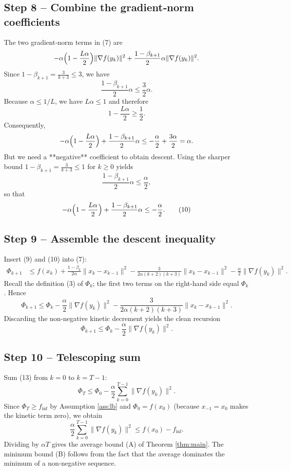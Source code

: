 \documentclass{article}
\begin{document}
\subsection*{Step 8 – Combine the gradient‑norm coefficients}
The two gradient‑norm terms in (7) are
\[
-\alpha\Bigl(1-\frac{L\alpha}{2}\Bigr)\|\nabla f(y_k)\|^{2}
+ \frac{1-\beta_{k+1}}{2}\alpha\|\nabla f(y_k)\|^{2}.
\]
Since $1-\beta_{k+1}= \frac{3}{k+3}\le 3$, we have
\[
\frac{1-\beta_{k+1}}{2}\alpha\le \frac{3}{2}\alpha.
\]
Because $\alpha\le 1/L$, we have $L\alpha\le 1$ and therefore
\[
1-\frac{L\alpha}{2}\ge \frac12.
\]
Consequently,
\[
-\alpha\Bigl(1-\frac{L\alpha}{2}\Bigr)+\frac{1-\beta_{k+1}}{2}\alpha
\le -\frac{\alpha}{2}+\frac{3\alpha}{2}
= \alpha.
\]
But we need a **negative** coefficient to obtain descent.  Using the sharper bound $1-\beta_{k+1}= \frac{3}{k+3}\le 1$ for $k\ge 0$ yields
\[
\frac{1-\beta_{k+1}}{2}\alpha\le \frac{\alpha}{2},
\]
so that
\[
-\alpha\Bigl(1-\frac{L\alpha}{2}\Bigr)+\frac{1-\beta_{k+1}}{2}\alpha
\le -\frac{\alpha}{2}.
\tag{10}
\]

\subsection*{Step 9 – Assemble the descent inequality}
Insert (9) and (10) into (7):
\begin{align}
\Phi_{k+1}
&\le f(x_k) + \frac{1-\beta_k}{2\alpha}\|x_k-x_{k-1}\|^{2}
-\frac{3}{2\alpha(k+2)(k+3)}\|x_k-x_{k-1}\|^{2}
-\frac{\alpha}{2}\|\nabla f(y_k)\|^{2}.
\tag{11}
\end{align}
Recall the definition (3) of $\Phi_k$; the first two terms on the right-hand side equal $\Phi_k$.  Hence
\[
\Phi_{k+1}\le \Phi_k -\frac{\alpha}{2}\|\nabla f(y_k)\|^{2}
-\frac{3}{2\alpha(k+2)(k+3)}\|x_k-x_{k-1}\|^{2}.
\tag{12}
\]
Discarding the non‑negative kinetic decrement yields the clean recursion
\[
\Phi_{k+1}\le \Phi_k -\frac{\alpha}{2}\|\nabla f(y_k)\|^{2}.
\tag{13}
\]

\subsection*{Step 10 – Telescoping sum}
Sum (13) from $k=0$ to $k=T-1$:
\[
\Phi_T \le \Phi_0 -\frac{\alpha}{2}\sum_{k=0}^{T-1}\|\nabla f(y_k)\|^{2}.
\]
Since $\Phi_T\ge f_{\inf}$ by Assumption \ref{ass:lb} and $\Phi_0 = f(x_0)$ (because $x_{-1}=x_0$ makes the kinetic term zero), we obtain
\[
\frac{\alpha}{2}\sum_{k=0}^{T-1}\|\nabla f(y_k)\|^{2}
\le f(x_0)-f_{\inf}.
\]
Dividing by $\alpha T$ gives the average bound (A) of Theorem \ref{thm:main}.  The minimum bound (B) follows from the fact that the average dominates the minimum of a non‑negative sequence.
\end{document}
